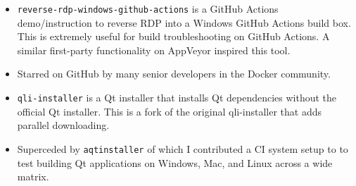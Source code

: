 \documentclass[10pt,letter,ragged2e]{altacv}
\begin{document}
\begin{paracol}{2}
\begin{itemize}
\item \texttt{reverse-rdp-windows-github-actions} is a GitHub Actions demo/instruction to reverse RDP into a Windows GitHub Actions build box. This is extremely useful for build troubleshooting on GitHub Actions. A similar first-party functionality on AppVeyor inspired this tool.
\item Starred on GitHub by many senior developers in the Docker community.
\end{itemize}




\divider


\begin{itemize}
\item \texttt{qli-installer} is a Qt installer that installs Qt dependencies without the official Qt installer. This is a fork of the original qli-installer that adds parallel downloading.
\item Superceded by \texttt{aqtinstaller} of which I contributed a CI system setup to to test building Qt applications on Windows, Mac, and Linux across a wide matrix.
\end{itemize}





\end{paracol}
\end{document}

